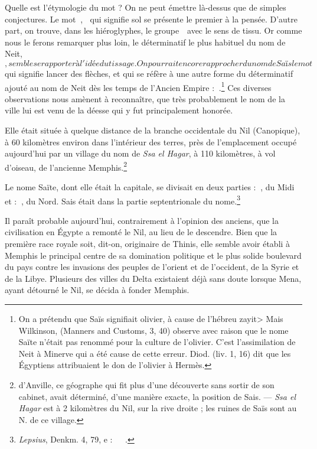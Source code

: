 \documentclass[letterpaper,twocolumn,openany,nodeprecatedcode]{dndbook}
\newcommand*\hieroAAAB{}
\newcommand*\hieroAAAI{}
\newcommand*\hieroAAAK{}
\newcommand*\hieroAAAL{}
\newcommand*\hieroAAAM{}
\newcommand*\hieroAAAN{\raisebox{0.3ex}{}}
\newcommand*\hieroAAAO{}
\newcommand*\hieroAAAP{}
\newcommand*\hieroAAAQ{}
\newcommand*\hieroAAAR{}
\newcommand*\hieroAAAX{}
\newcommand*\hieroAAAY{}
\newcommand*\hieroAAAZ{}
\newcommand*\hieroAABA{}
\newcommand*\hieroAABB{}
\newcommand*\hieroAABC{\raisebox{0.5ex}{}}
\newcommand*\hieroAABD{}
\newcommand*\hieroAABE{}
\begin{document}
Quelle est l'étymologie du mot ? On ne peut émettre là-dessus que de simples conjectures. Le mot $\hieroAAAI\:\hieroAAAK$, $\hieroAAAI\:\hieroAAAL$ qui signifie sol se présente le premier à la pensée. D'autre part, on trouve, dans les hiéroglyphes, le groupe $\hieroAAAM\:\hieroAAAN$ avec le sens de tissu. Or comme nous le ferons remarquer plus loin, le déterminatif le plus habituel du nom de Neit, $\hieroAAAO$, semble se rapporter à l'idée du tissage. On pourrait encore rapprocher du nom de Saïs le mot $\hieroAAAP$ qui signifie lancer des flèches, et qui se réfère à une autre forme du déterminatif ajouté au nom de Neit dès les temps de l'Ancien Empire : $\hieroAAAQ\:\hieroAAAR$.\footnote{On a prétendu que Saïs signifiait olivier, à cause de l'hébreu \foreignlanguage{hebrew}{\<zayit>} Mais Wilkinson, (Manners and Customs, 3, 40) observe avec raison que le nome Saïte n'était pas renommé pour la culture de l'olivier. C'est l'assimilation de Neit à Minerve qui a été cause de cette erreur. Diod. (liv. 1, 16) dit que les Égyptiens attribuaient le don de l'olivier à Hermès.} Ces diverses observations nous amènent à reconnaître, que très probablement le nom de la ville lui est venu de la déesse qui y fut principalement honorée.

Elle était située à quelque distance de la branche occidentale du Nil (Canopique), à 60 kilomètres environ dans l'intérieur des terres, près de l'emplacement occupé aujourd’hui par un village du nom de \emph{Ssa el Hagar}, à 110 kilomètres, à vol d'oiseau, de l'ancienne Memphis.\footnote{d'Anville, ce géographe qui fit plus d'une découverte sans sortir de son cabinet, avait déterminé, d'une manière exacte, la position de Sais. --- \emph{Ssa el Hagar} est à 2 kilomètres du Nil, sur la rive droite ; les ruines de Saïs sont au N. de ce village.}

Le nome Saïte, dont elle était la capitale, se divisait en deux parties : $\hieroAAAB\:\hieroAAAX$, du Midi et : $\hieroAAAB\:\hieroAAAY$, du Nord. Sais était dans la partie septentrionale du nome.\footnote{\emph{Lepsius}, Denkm. 4, 79, e : $\hieroAAAZ\:\hieroAABA\:\hieroAABB\:\hieroAABC\:\hieroAABD\:\hieroAABE$.}

Il paraît probable aujourd'hui, contrairement à l'opinion des anciens, que la civilisation en Égypte a remonté le Nil, au lieu de le descendre. Bien que la première race royale soit, dit-on, originaire de Thinis, elle semble avoir établi à Memphis le principal centre de sa domination politique et le plus solide boulevard du pays contre les invasions des peuples de l'orient et de l'occident, de la Syrie et de la Libye. Plusieurs des villes du Delta existaient déjà sans doute lorsque Mena, ayant détourné le Nil, se décida à fonder Memphis.
\end{document}
